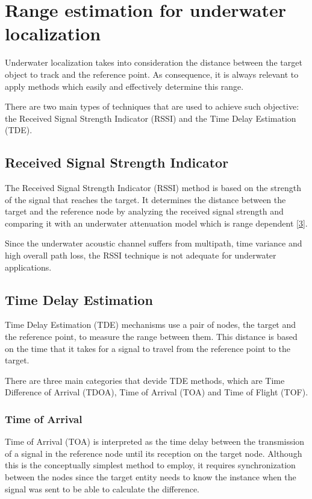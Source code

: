 
\section{Range estimation for underwater localization}

Underwater localization takes into consideration the distance between the target object to track and the reference point. As consequence, it is always relevant to apply methods which easily and effectively determine this range.

There are two main types of techniques that are used to achieve such objective: the Received Signal Strength Indicator (RSSI) and the Time Delay Estimation (TDE).


\subsection{Received Signal Strength Indicator}

The Received Signal Strength Indicator (RSSI) method is based on the strength of the signal that reaches the target. It determines the distance between the target and the reference node by analyzing the received signal strength and comparing it with an underwater attenuation model which is range dependent [\hyperref[r:ocean-acoust]{3}]. 

Since the underwater acoustic channel suffers from multipath, time variance and high overall path loss, the RSSI technique is not adequate for underwater applications.

\subsection{Time Delay Estimation}
Time Delay Estimation (TDE) mechanisms use a pair of nodes, the target and the reference point, to measure the range between them. This distance is based on the time that it takes for a signal to travel from the reference point to the target.

There are three main categories that devide TDE methods, which are Time Difference of Arrival (TDOA), Time of Arrival (TOA) and Time of Flight (TOF).

\subsubsection{Time of Arrival}

Time of Arrival (TOA) is interpreted as the time delay between the transmission of a signal in the reference node until its reception on the target node. Although this is the conceptually simplest method to employ, it requires synchronization between the nodes since the target entity needs to know the instance when the signal was sent to be able to calculate the difference.

